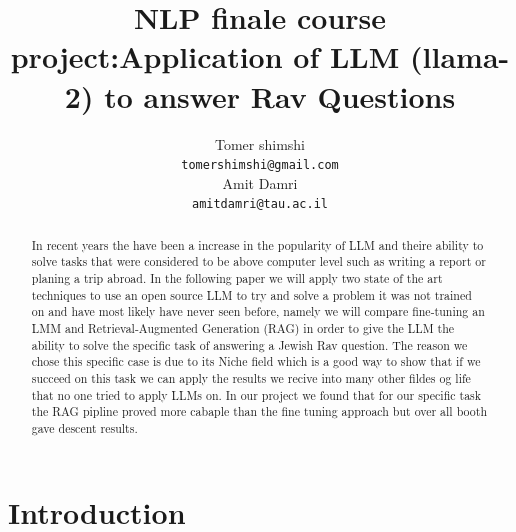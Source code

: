 \documentclass[11pt]{article}
\title{NLP finale course project:Application of LLM (llama-2) to
answer Rav Questions }
\author{Tomer shimshi \\
  \texttt{tomershimshi@gmail.com} \\\And
  Amit Damri \\
  \texttt{amitdamri@tau.ac.il} \\}
\begin{document}
\maketitle
\begin{abstract}
In recent years the have been a increase in the popularity of LLM and theire ability to solve tasks that were considered to be above computer level such as writing a report or planing a trip abroad.
In the following paper we will apply two state of the art techniques to use an open source LLM to try and solve a problem it was not trained on and have most likely have never seen before, namely we will compare fine-tuning an LMM and  Retrieval-Augmented Generation (RAG) in order to give the LLM the ability to solve the specific task of answering a Jewish Rav question. The reason we chose this specific case is due to its Niche field which is a good way to show that if we succeed on this task we can apply the results we recive into many other fildes og life that no one tried to apply LLMs on.
In our project we found that for our specific task the RAG pipline proved more cabaple than the fine tuning approach but over all booth gave descent results.
\end{abstract}

\section{Introduction}
\end{document}
